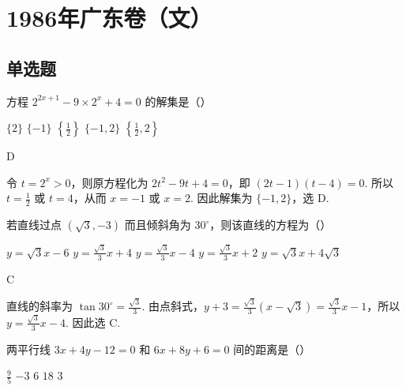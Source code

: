 \chapter{1986年广东卷（文）}

\section{单选题}

\begin{problem}

方程 \(2^{2x+1}-9\times2^{x}+4=0 \) 的解集是（\quad）

\choicesfive
    {\(\{2\}\)}
    {\(\{-1\} \)}
    {\(\left\{\frac{1}{2}\right\} \)}
    {\(\{-1, 2\} \)}
    {\(\left\{\frac{1}{2}, 2\right\} \)}
\end{problem}

\begin{answer}
D
\end{answer}

\begin{solution}
令 \(t=2^x>0\)，则原方程化为 \(2t^2-9t+4=0\)，即 \((2t-1)(t-4)=0\). 所以 \(t=\frac{1}{2}\) 或 \(t=4\)，从而 \(x=-1\) 或 \(x=2\). 因此解集为 \(\{-1,2\}\)，选 D.
\end{solution}



\begin{problem}

若直线过点 \(\left(\sqrt{3}, -3\right)\) 而且倾斜角为 \(30^{\circ}\)，则该直线的方程为（\quad）

\choicesfive
    {\(y = \sqrt{3} x - 6 \)}
    {\(y = \frac{\sqrt{3}}{3} x + 4 \)}
    {\(y = \frac{\sqrt{3}}{3} x - 4 \)}
    {\(y = \frac{\sqrt{3}}{3} x + 2\)}
    {\(y = \sqrt{3} x + 4\sqrt{3} \)}
\end{problem}

\begin{answer}
C
\end{answer}

\begin{solution}
直线的斜率为 \(\tan30^{\circ}=\frac{\sqrt{3}}{3}\). 由点斜式，\(y+3=\frac{\sqrt{3}}{3}(x-\sqrt{3})=\frac{\sqrt{3}}{3}x-1\)，所以 \(y=\frac{\sqrt{3}}{3}x-4\). 因此选 C.
\end{solution}



\begin{problem}

两平行线 \(3x + 4y - 12 = 0\) 和 \(6x + 8y + 6 = 0\) 间的距离是（\quad）

\choicesfive
    {\(\frac{9}{5}\)}
    {\(-3\)}
    {\(6\)}
    {\(18\)}
    {\(3\)}
\end{problem}

